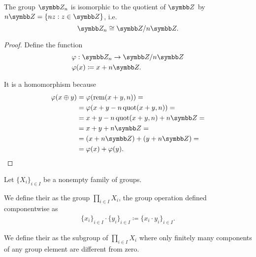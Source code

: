 \begin{proposition}\label{thm:integers_modulo_isomorphic_to_quotient_group}
  The group \( \Z_n \) is isomorphic to the quotient of \( \Z \) by \( n\Z = \{ nz : z \in \Z \} \), i.e.
  \begin{equation*}
    \Z_n \cong \Z / n\Z.
  \end{equation*}
\end{proposition}
\begin{proof}
  Define the function
  \begin{align*}
    &\varphi: \Z_n \to \Z / n\Z \\
    &\varphi(x) \coloneqq x + n\Z.
  \end{align*}

  It is a homomorphism because
  \begin{align*}
    \varphi(x \oplus y)
    &=
    \varphi(\Rem(x + y, n))
    = \\ &=
    \varphi(x + y - n \Quot(x + y, n))
    = \\ &=
    x + y - n \Quot(x + y, n) + n\Z
    = \\ &=
    x + y + n\Z
    = \\ &=
    (x + n\Z) + (y + n\Z)
    = \\ &=
    \varphi(x) + \varphi(y).
  \end{align*}
\end{proof}

\begin{definition}\label{def:group_direct_product}
  Let \( \{ X_i \}_{i \in I} \) be a nonempty family of groups.

  We define their  as the group \( \prod_{i \in I} X_i \), the group operation defined componentwise as
  \begin{align*}
    \{ x_i \}_{i \in I} \cdot \{ y_i \}_{i \in I}
    \coloneqq
    \{ x_i \cdot y_i \}_{i \in I}.
  \end{align*}

  We define their  as the subgroup of \( \prod_{i \in I} X_i \) where only finitely many components of any group element are different from zero.
\end{definition}

